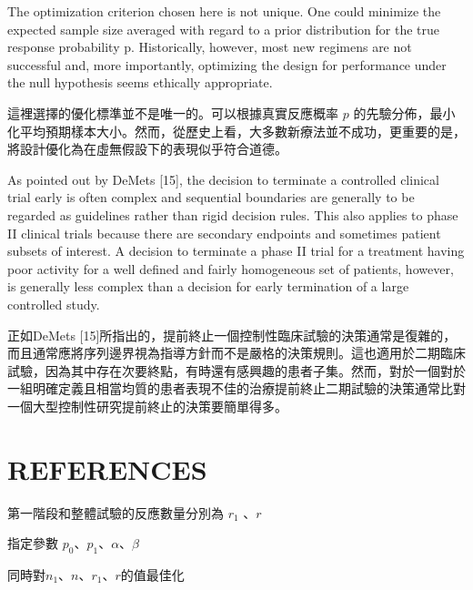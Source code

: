 	The optimization criterion chosen here is not unique. One could minimize the expected sample size averaged with regard to a prior distribution for the true response probability p. Historically, however, most new regimens are not successful and, more importantly, optimizing the design for performance under the null hypothesis seems ethically appropriate. 

	這裡選擇的優化標準並不是唯一的。可以根據真實反應概率 $p$ 的先驗分佈，最小化平均預期樣本大小。然而，從歷史上看，大多數新療法並不成功，更重要的是，將設計優化為在虛無假設下的表現似乎符合道德。

	As pointed out by DeMets [15], the decision to terminate a controlled clinical trial early is often complex and sequential boundaries are generally to be regarded as guidelines rather than rigid decision rules. This also applies to phase II clinical trials because there are secondary endpoints and sometimes patient subsets of interest. A decision to terminate a phase II trial for a treatment having poor activity for a well defined and fairly homogeneous set of patients, however, is generally less complex than a decision for early termination of a large controlled study.

	正如DeMets [15]所指出的，提前終止一個控制性臨床試驗的決策通常是復雜的，而且通常應將序列邊界視為指導方針而不是嚴格的決策規則。這也適用於二期臨床試驗，因為其中存在次要終點，有時還有感興趣的患者子集。然而，對於一個對於一組明確定義且相當均質的患者表現不佳的治療提前終止二期試驗的決策通常比對一個大型控制性研究提前終止的決策要簡單得多。
\section{REFERENCES}
第一階段和整體試驗的反應數量分別為 $r_1$ 、$r$

指定參數 $p_0$、$p_1$、$\alpha$、$\beta$

同時對$n_1$、$n$、$r_1$、$r$的值最佳化

